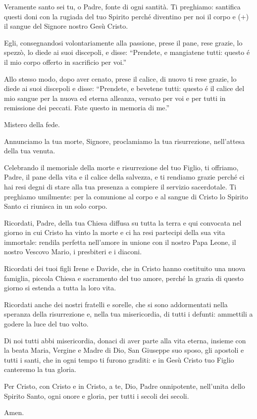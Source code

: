 	\begin{dialoghi}
		\item[\sacerdote] Veramente santo sei tu, o Padre, fonte di ogni santità. Ti preghiamo: santifica questi doni con la rugiada del tuo Spirito perché diventino per noi il corpo e (+) il sangue del Signore nostro Gesù Cristo.

		Egli, consegnandosi volontariamente alla passione, prese il pane, rese grazie, lo spezzò, lo diede ai suoi discepoli, e disse: \textquotedblleft {Prendete, e mangiatene tutti: questo é il mio corpo offerto in sacrificio per voi.}\textquotedblright

		Allo stesso modo, dopo aver cenato, prese il calice, di nuovo ti rese grazie, lo diede ai suoi discepoli e disse: \textquotedblleft {Prendete, e bevetene tutti: questo é il calice del mio sangue per la nuova ed eterna alleanza, versato per voi e per tutti in remissione dei peccati. Fate questo in memoria di me.}\textquotedblright

		Mistero della fede.
		\item[\assemblea] Annunciamo la tua morte, Signore, proclamiamo la tua risurrezione, nell'attesa della tua venuta.
		\item[\sacerdote] Celebrando il memoriale della morte e risurrezione del tuo Figlio, ti offriamo, Padre, il pane della vita e il calice della salvezza, e ti rendiamo grazie perché ci hai resi degni di stare alla tua presenza a compiere il servizio sacerdotale. Ti preghiamo umilmente: per la comunione al corpo e al sangue di Cristo lo Spirito Santo ci riunisca in un solo corpo.

		Ricordati, Padre, della tua Chiesa diffusa su tutta la terra e qui convocata nel giorno in cui Cristo ha vinto la morte e ci ha resi partecipi della sua vita immortale: rendila perfetta nell'amore in unione con il nostro Papa Leone, il nostro Vescovo Mario, i presbiteri e i diaconi.

		Ricordati dei tuoi figli Irene e Davide, che in Cristo hanno costituito una nuova famiglia, piccola Chiesa e sacramento del tuo amore, perché la grazia di questo giorno si estenda a tutta la loro vita.

		Ricordati anche dei nostri fratelli e sorelle, che si sono addormentati nella speranza della risurrezione e, nella tua misericordia, di tutti i defunti: ammettili a godere la luce del tuo volto.

		Di noi tutti abbi misericordia, donaci di aver parte alla vita eterna, insieme con la beata Maria, Vergine e Madre di Dio, San Giuseppe suo sposo, gli apostoli e tutti i santi, che in ogni tempo ti furono graditi: e in Gesù Cristo tuo Figlio canteremo la tua gloria.

		Per Cristo, con Cristo e in Cristo, a te, Dio, Padre onnipotente, nell'unita dello Spirito Santo, ogni onore e gloria, per tutti i secoli dei secoli.
		\item[\assemblea] Amen.
	\end{dialoghi}
